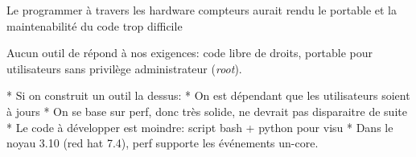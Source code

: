             Le programmer à travers les hardware compteurs aurait rendu le portable et la maintenabilité du code trop difficile
            
            Aucun outil de répond à nos exigences: code libre de droits, portable pour utilisateurs sans privilège administrateur (\textit{root}).
            
            * Si on construit un outil la dessus:
    * On est dépendant que les utilisateurs soient à jours
    * On se base sur perf, donc très solide, ne devrait pas disparaitre de suite
    * Le code à développer est moindre: script bash + python pour visu
    * Dans le noyau 3.10 (red hat 7.4), perf supporte les événements un-core. 